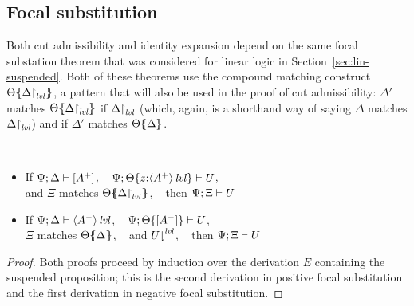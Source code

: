 \subsection{Focal substitution}

Both cut admissibility and identity expansion depend on the same
focal substation theorem that was considered for linear logic in 
Section~\ref{sec:lin-suspended}. Both of these theorems use the
compound matching construct ${\Theta}\mbox{$\{\hspace{-4pt}\{$}{\ensuremath{{\Delta}{\upharpoonright}_{{\it lvl}}}}\mbox{$\}\hspace{-4pt}\}$}$,
a pattern that will also be used in the proof of cut admissibility: 
$\Delta'$ matches ${\Theta}\mbox{$\{\hspace{-4pt}\{$}{\ensuremath{{\Delta}{\upharpoonright}_{{\it lvl}}}}\mbox{$\}\hspace{-4pt}\}$}$
if ${\Delta}{\upharpoonright}_{{\it lvl}}$ (which, again, is a shorthand way of 
saying $\Delta$ matches ${\Delta}{\upharpoonright}_{{\it lvl}}$) and if
$\Delta'$ matches ${\Theta}\mbox{$\{\hspace{-4pt}\{$}{\Delta}\mbox{$\}\hspace{-4pt}\}$}$.

\bigskip
\begin{theorem}~
\begin{itemize}
\item If ${\Psi};{\Delta} \vdash {[A^+]} \mathstrut$, ~
      ${\Psi};{{\Theta}\{{z{:}{\langle {A^+} \rangle}\,{{\it lvl}}}\}} \vdash {U} \mathstrut$,\\
      and $\Xi$ matches ${\Theta}\mbox{$\{\hspace{-4pt}\{$}{\ensuremath{{\Delta}{\upharpoonright}_{{\it lvl}}}}\mbox{$\}\hspace{-4pt}\}$}$, ~
      then ${\Psi};{\Xi} \vdash {U} \mathstrut$
\item If ${\Psi};{\Delta} \vdash {{\langle {A^-} \rangle}\,{{\it lvl}}} \mathstrut$, ~
      ${\Psi};{{\Theta}\{{[A^-]}\}} \vdash {U} \mathstrut$, \\
      $\Xi$ matches ${\Theta}\mbox{$\{\hspace{-4pt}\{$}{\Delta}\mbox{$\}\hspace{-4pt}\}$}$, ~
      and ${U}{\downharpoonright}^{{\it lvl}}$, ~
      then ${\Psi};{\Xi} \vdash {U} \mathstrut$
\end{itemize}
\end{theorem}

\begin{proof}
Both proofs proceed by induction over the derivation $E$ containing
the suspended proposition; this is the second derivation in positive 
focal substitution and the first derivation in negative focal substitution. 
\end{proof}

